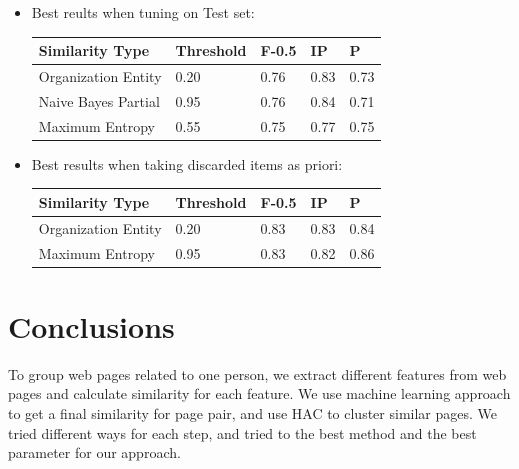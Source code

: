 \documentclass{article}
\begin{document}
\begin{CJK}{UTF8}{gbsn}
\begin{itemize}
    \item Best reults when tuning on Test set: \\
    \begin{tabular}{|l|l|l|l|l|}
    \hline
    \textbf{Similarity Type} & \textbf{Threshold} & \textbf{F-0.5} & \textbf{IP} & \textbf{P} \\
    \hline
    Organization Entity & 0.20 & 0.76 & 0.83 & 0.73 \\
    \hline
    Naive Bayes Partial & 0.95 & 0.76 & 0.84 & 0.71 \\
    \hline
    Maximum Entropy & 0.55 & 0.75 & 0.77 & 0.75 \\
    \hline
    \end{tabular}
    \item Best results when taking discarded items as priori: \\
    \begin{tabular}{|l|l|l|l|l|}
    \hline
    \textbf{Similarity Type} & \textbf{Threshold} & \textbf{F-0.5} & \textbf{IP} & \textbf{P} \\
    \hline
    Organization Entity & 0.20 & 0.83 & 0.83 & 0.84 \\
    \hline
    Maximum Entropy & 0.95 & 0.83 & 0.82 & 0.86 \\
    \hline
    \end{tabular}

    \end{itemize}

\section{Conclusions}
    To group web pages related to one person, we extract different features from web pages and calculate similarity for each feature. We use machine learning approach to get a final similarity for page pair, and use HAC to cluster similar pages. We tried different ways for each step, and tried to the best method and the best parameter for our approach. 




\end{CJK}
\end{document}

